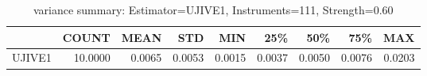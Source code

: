 \begin{table}[ht]
\centering
\caption{variance summary: Estimator=UJIVE1, Instruments=111, Strength=0.60}
\begin{tabular}{lrrrrrrrr}
\toprule
 & COUNT & MEAN & STD & MIN & 25\% & 50\% & 75\% & MAX \\
\midrule
UJIVE1 & 10.0000 & 0.0065 & 0.0053 & 0.0015 & 0.0037 & 0.0050 & 0.0076 & 0.0203 \\
\bottomrule
\end{tabular}
\end{table}
